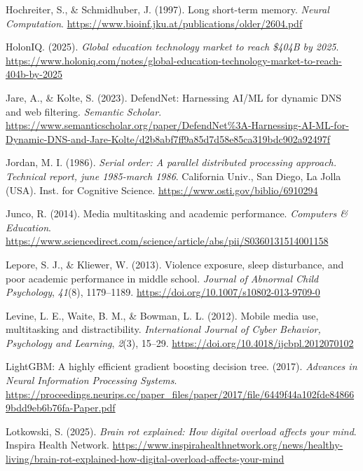 \documentclass[
  titlepage]{article}
\newlength{\cslhangindent}
\newenvironment{CSLReferences}[2] %
 {\begin{list}{}{%
  \setlength{\itemindent}{0pt}
  \setlength{\leftmargin}{0pt}
  \setlength{\parsep}{0pt}
  \ifodd #1
   \setlength{\leftmargin}{\cslhangindent}
   \setlength{\itemindent}{-1\cslhangindent}
  \fi
  \setlength{\itemsep}{#2\baselineskip}}}
 {\end{list}}
\begin{document}
\begin{CSLReferences}{1}{0}
Hochreiter, S., \& Schmidhuber, J. (1997). Long short-term memory.
\emph{Neural Computation}.
\url{https://www.bioinf.jku.at/publications/older/2604.pdf}

HolonIQ. (2025). \emph{Global education technology market to reach
\$404B by 2025}.
\url{https://www.holoniq.com/notes/global-education-technology-market-to-reach-404b-by-2025}

Jare, A., \& Kolte, S. (2023). DefendNet: Harnessing AI/ML for dynamic
DNS and web filtering. \emph{Semantic Scholar}.
\url{https://www.semanticscholar.org/paper/DefendNet\%3A-Harnessing-AI-ML-for-Dynamic-DNS-and-Jare-Kolte/d2b8abf7ff9a85d7d58e85ca319bdc902a92497f}

Jordan, M. I. (1986). \emph{Serial order: A parallel distributed
processing approach. Technical report, june 1985-march 1986}. California
Univ., San Diego, La Jolla (USA). Inst. for Cognitive Science.
\url{https://www.osti.gov/biblio/6910294}

Junco, R. (2014). Media multitasking and academic performance.
\emph{Computers \& Education}.
\url{https://www.sciencedirect.com/science/article/abs/pii/S0360131514001158}

Lepore, S. J., \& Kliewer, W. (2013). Violence exposure, sleep
disturbance, and poor academic performance in middle school.
\emph{Journal of Abnormal Child Psychology}, \emph{41}(8), 1179--1189.
\url{https://doi.org/10.1007/s10802-013-9709-0}

Levine, L. E., Waite, B. M., \& Bowman, L. L. (2012). Mobile media use,
multitasking and distractibility. \emph{International Journal of Cyber
Behavior, Psychology and Learning}, \emph{2}(3), 15--29.
\url{https://doi.org/10.4018/ijcbpl.2012070102}

LightGBM: A highly efficient gradient boosting decision tree. (2017).
\emph{Advances in Neural Information Processing Systems}.
\url{https://proceedings.neurips.cc/paper_files/paper/2017/file/6449f44a102fde848669bdd9eb6b76fa-Paper.pdf}

Lotkowski, S. (2025). \emph{Brain rot explained: How digital overload
affects your mind}. Inspira Health Network.
\url{https://www.inspirahealthnetwork.org/news/healthy-living/brain-rot-explained-how-digital-overload-affects-your-mind}


\end{CSLReferences}
\end{document}
